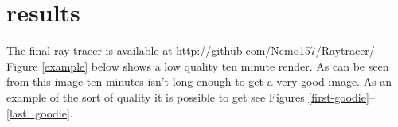 \chapter{results}
  The final ray tracer is available at
  \url{http://github.com/Nemo157/Raytracer/}
  Figure \ref{example} below shows a low quality ten minute render.  As can be
  seen from this image ten minutes isn't long enough to get a very good image.
  As an example of the sort of quality it is possible to get see Figures
  \ref{first-goodie}--\ref{last_goodie}.
